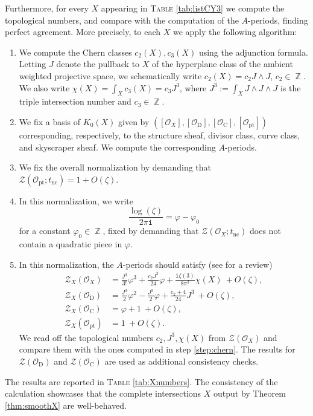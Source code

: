 \documentclass[12pt,a4paper,oneside]{amsart}
\numberwithin{equation}{section}
\theoremstyle{definition}
\theoremstyle{remark}
\DeclareMathOperator{\Z}{\mathbb{Z}}
\newcommand{\mz}{\mathcal{Z}}
\newcommand{\ii}{\mathtt{i}}
\newcommand{\tnc}{t_{\mathrm{nc}}}
\begin{document}
Furthermore, for every $X$ appearing in \textsc{Table} \ref{tab:listCY3} we compute the topological numbers, and compare with the computation of the $A$-periods, finding perfect agreement. More precisely, to each $X$ we apply the following algorithm:
\begin{enumerate}
    \item\label{step:chern} We compute the Chern classes $c_2 (X), c_3 (X)$ using the adjunction formula. Letting $J$ denote the pullback to $X$ of the hyperplane class of the ambient weighted projective space, we schematically write $c_2 (X) = c_2 J \wedge J $, $c_2 \in \Z$. We also write $\chi (X) = \int_X c_3 (X) =c_3 J^3$, where $J^3 := \int_X J \wedge J \wedge J$ is the triple intersection number and $c_3 \in \Z$.
    \item We fix a basis of $K_0 (X)$ given by $([\mathcal{O}_X], [\mathcal{O}_{\mathrm{D}}], [\mathcal{O}_{\mathrm{C}}], [\mathcal{O}_{\mathrm{pt}}])$ corresponding, respectively, to the structure sheaf, divisor class, curve class, and skyscraper sheaf. We compute the corresponding $A$-periods.
    \item We fix the overall normalization by demanding that $\mz (\mathcal{O}_{\mathrm{pt}}; \tnc) = 1 + O(\zeta)$.
    \item  In this normalization, we write 
    \begin{equation*}
        \frac{\log (\zeta) }{2\pi \ii }= \varphi - \varphi_0 
    \end{equation*}
    for a constant $\varphi_0 \in \Z$, fixed by demanding that $\mz (\mathcal{O}_{X}; \tnc)$ does not contain a quadratic piece in $\varphi$.
    \item In this normalization, the $A$-periods should satisfy (see \cite[\S 3.2]{Lin:2024fpz} for a review) 
    \begin{equation*}
    \begin{aligned}
        \mz_X (\mathcal{O}_{X}) &= \frac{J^3}{3!}\varphi^3 + \frac{c_2 J^3}{24}\varphi + \frac{\ii \zeta (3)}{8 \pi^3}  \chi (X) \ + O(\zeta), \\
        \mz_X (\mathcal{O}_{\mathrm{D}}) &= \frac{J^3}{2}\varphi^2 - \frac{J^3}{2}\varphi +\frac{c_2 +4}{24} J^3 \ + O(\zeta), \\
        \mz_X (\mathcal{O}_{\mathrm{C}}) &= \varphi + 1 \ + O(\zeta), \\
        \mz_X (\mathcal{O}_{\mathrm{pt}}) &= 1 \ + O(\zeta). 
    \end{aligned}
    \end{equation*}
    We read off the topological numbers $c_2, J^3, \chi (X)$ from $\mz (\mathcal{O}_{X})$ and compare them with the ones computed in step \eqref{step:chern}. The results for $\mz (\mathcal{O}_{\mathrm{D}})$ and $\mz (\mathcal{O}_{\mathrm{C}})$ are used as additional consistency checks. 
\end{enumerate}
The results are reported in \textsc{Table} \ref{tab:Xnumbers}. The consistency of the calculation showcases that the complete intersections $X$ output by Theorem \ref{thm:smoothX} are well-behaved.\par
\end{document}
